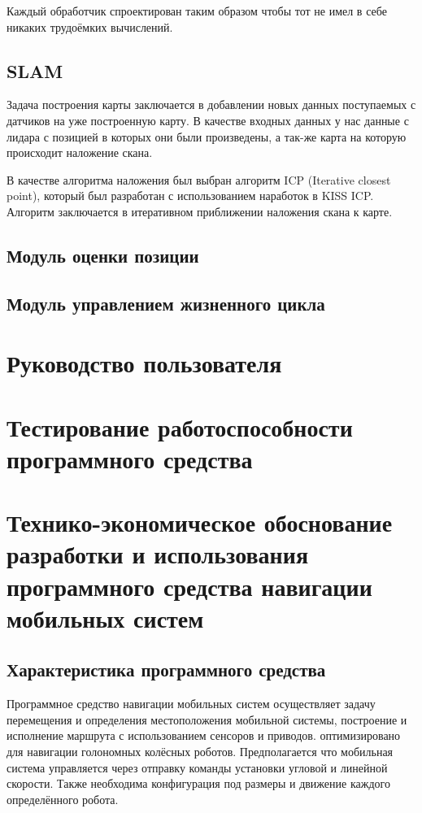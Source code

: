 Каждый обработчик спроектирован таким образом чтобы тот не имел в себе никаких трудоёмких вычислений.

\subsection{SLAM}
Задача построения карты заключается в добавлении новых данных поступаемых с датчиков на уже построенную карту.
В качестве входных данных у нас данные с лидара с позицией в которых они были произведены, а так-же карта на которую происходит наложение скана.

В качестве алгоритма наложения был выбран алгоритм ICP (Iterative closest point), который был разработан с использованием наработок в KISS ICP.
Алгоритм заключается в итеративном приближении наложения скана к карте.


\subsection{Модуль оценки позиции}
\subsection{Модуль управлением жизненного цикла}
\section{Руководство пользователя}


\section{Тестирование работоспособности программного средства}

	\section{Технико-экономическое обоснование разработки и использования
	программного средства навигации мобильных систем}

\subsection{Характеристика программного средства}
Программное средство навигации мобильных систем осуществляет задачу перемещения
и определения местоположения мобильной системы, построение и исполнение 
маршрута с использованием сенсоров и приводов. \appname{} оптимизировано для
навигации голономных колёсных роботов. Предполагается что мобильная система 
управляется через отправку команды установки угловой и линейной скорости. 
Также необходима конфигурация под размеры и движение каждого определённого
робота.

